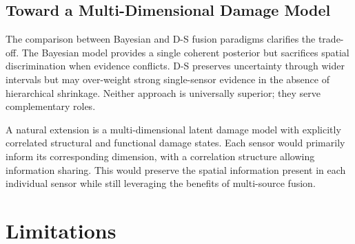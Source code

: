 \documentclass[wcp]{jmlr}
\begin{document}
\subsection{Toward a Multi-Dimensional Damage Model}

The comparison between Bayesian and D-S fusion paradigms clarifies the
trade-off. The Bayesian model provides a single coherent posterior but
sacrifices spatial discrimination when evidence conflicts. D-S preserves
uncertainty through wider intervals but may over-weight strong
single-sensor evidence in the absence of hierarchical shrinkage. Neither
approach is universally superior; they serve complementary roles.

A natural extension is a multi-dimensional latent damage model with
explicitly correlated structural and functional damage states. Each sensor
would primarily inform its corresponding dimension, with a correlation
structure allowing information sharing. This would preserve the spatial
information present in each individual sensor while still leveraging the
benefits of multi-source fusion.

\section{Limitations}\label{sec:limitations}
\end{document}
